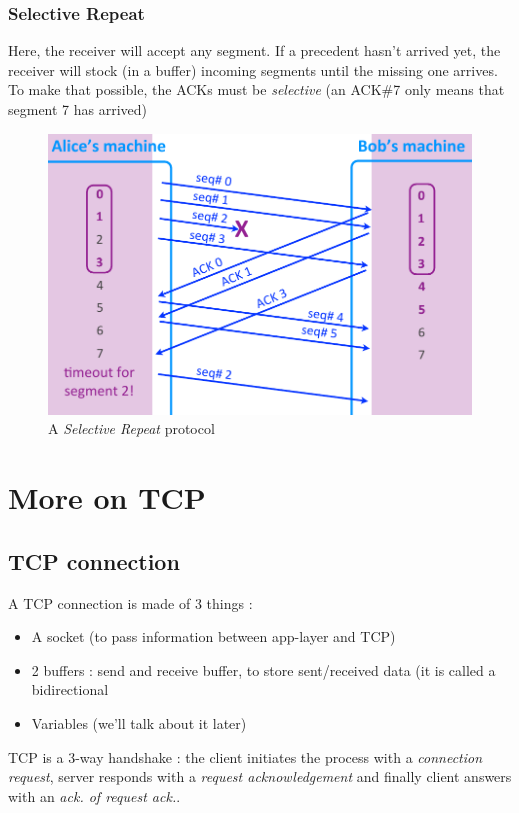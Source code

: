 \documentclass[12pt,a4paper]{article}
\begin{document}
\subsubsection{Selective Repeat}
Here, the receiver will accept any segment. If a precedent hasn't arrived yet, the receiver will stock (in a buffer) incoming segments until the missing one arrives. To make that possible, the ACKs must be \textit{selective} (an ACK\#7 only means that segment 7 has arrived)
\begin{figure}[!h]
	\centering
	\includegraphics[scale=0.4]{images/selective}
	\caption{A \textit{Selective Repeat} protocol}
	\label{fig: selective repeat}
\end{figure}


\section{More on TCP}
\subsection{TCP connection}
A TCP connection is made of 3 things :
\begin{itemize}
	\item 	A socket (to pass information between app-layer and TCP)
	\item 	2 buffers : send and receive buffer, to store sent/received data (it is called a bidirectional
	\item 	Variables (we'll talk about it later)
\end{itemize}
TCP is a 3-way handshake : the client initiates the process with a \textit{connection request}, server responds with a \textit{request acknowledgement} and finally client answers with an \textit{ack. of request ack.}.
\end{document}
